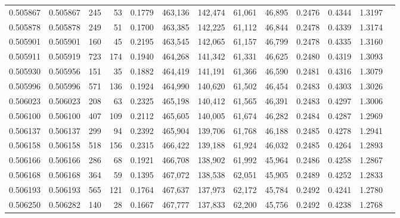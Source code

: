 \begin{tabular}{rrrrrrrrrrrrr}
0.505867 & 0.505867 &   245 &    53 &                                     0.1779 & 463,136 & 142,474 &  61,061 &  46,895 & 0.2476 & 0.4344 & 1.3197 \\
0.505878 & 0.505878 &   249 &    51 &                                     0.1700 & 463,385 & 142,225 &  61,112 &  46,844 & 0.2478 & 0.4339 & 1.3174 \\
0.505901 & 0.505901 &   160 &    45 &                                     0.2195 & 463,545 & 142,065 &  61,157 &  46,799 & 0.2478 & 0.4335 & 1.3160 \\
0.505911 & 0.505919 &   723 &   174 &                                     0.1940 & 464,268 & 141,342 &  61,331 &  46,625 & 0.2480 & 0.4319 & 1.3093 \\
0.505930 & 0.505956 &   151 &    35 &                                     0.1882 & 464,419 & 141,191 &  61,366 &  46,590 & 0.2481 & 0.4316 & 1.3079 \\
0.505996 & 0.505996 &   571 &   136 &                                     0.1924 & 464,990 & 140,620 &  61,502 &  46,454 & 0.2483 & 0.4303 & 1.3026 \\
0.506023 & 0.506023 &   208 &    63 &                                     0.2325 & 465,198 & 140,412 &  61,565 &  46,391 & 0.2483 & 0.4297 & 1.3006 \\
0.506100 & 0.506100 &   407 &   109 &                                     0.2112 & 465,605 & 140,005 &  61,674 &  46,282 & 0.2484 & 0.4287 & 1.2969 \\
0.506137 & 0.506137 &   299 &    94 &                                     0.2392 & 465,904 & 139,706 &  61,768 &  46,188 & 0.2485 & 0.4278 & 1.2941 \\
0.506158 & 0.506158 &   518 &   156 &                                     0.2315 & 466,422 & 139,188 &  61,924 &  46,032 & 0.2485 & 0.4264 & 1.2893 \\
0.506166 & 0.506166 &   286 &    68 &                                     0.1921 & 466,708 & 138,902 &  61,992 &  45,964 & 0.2486 & 0.4258 & 1.2867 \\
0.506168 & 0.506168 &   364 &    59 &                                     0.1395 & 467,072 & 138,538 &  62,051 &  45,905 & 0.2489 & 0.4252 & 1.2833 \\
0.506193 & 0.506193 &   565 &   121 &                                     0.1764 & 467,637 & 137,973 &  62,172 &  45,784 & 0.2492 & 0.4241 & 1.2780 \\
0.506250 & 0.506282 &   140 &    28 &                                     0.1667 & 467,777 & 137,833 &  62,200 &  45,756 & 0.2492 & 0.4238 & 1.2768 \\

\end{tabular}
